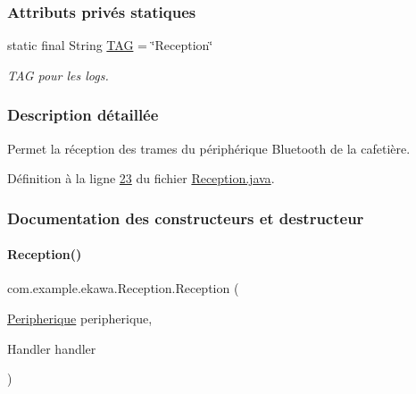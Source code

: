\subsubsection*{Attributs privés statiques}
\begin{DoxyCompactItemize}
\item 
static final String \hyperlink{classcom_1_1example_1_1ekawa_1_1_reception_a4e155d4690591616f1064e17764df72b}{T\+AG} = \char`\"{}Reception\char`\"{}
\begin{DoxyCompactList}\small\item\em T\+AG pour les logs. \end{DoxyCompactList}\end{DoxyCompactItemize}


\subsubsection{Description détaillée}
Permet la réception des trames du périphérique Bluetooth de la cafetière. 

Définition à la ligne \hyperlink{_reception_8java_source_l00023}{23} du fichier \hyperlink{_reception_8java_source}{Reception.\+java}.



\subsubsection{Documentation des constructeurs et destructeur}
\mbox{\label{classcom_1_1example_1_1ekawa_1_1_reception_a82ddcbf05814957889ace3961d8cfde6}} 
\paragraph{\texorpdfstring{Reception()}{Reception()}}
{\footnotesize\ttfamily com.\+example.\+ekawa.\+Reception.\+Reception (\begin{DoxyParamCaption}\item[{\hyperlink{classcom_1_1example_1_1ekawa_1_1_peripherique}{Peripherique}}]{peripherique,  }\item[{Handler}]{handler }\end{DoxyParamCaption})}



